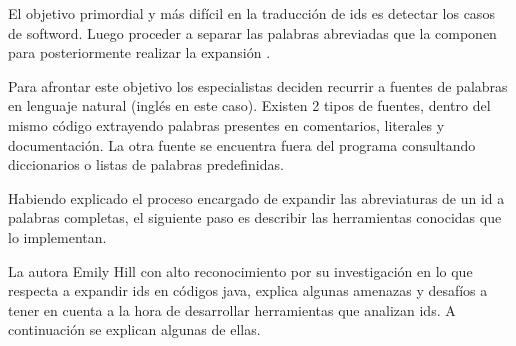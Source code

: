 \documentclass[a4paper,12pt]{report}
\begin{document}
\begin{framed}
\noindent El objetivo primordial y más difícil en la traducción de ids es detectar los casos de softword. Luego proceder a separar las palabras abreviadas que la componen para posteriormente realizar la expansión \cite{FBL06,LFBEX07}.  
\end{framed}

Para afrontar este objetivo los especialistas deciden recurrir a fuentes de palabras en lenguaje natural (inglés en este caso). Existen 2 tipos de fuentes, dentro del mismo código extrayendo palabras presentes en comentarios, literales y documentación. La otra fuente se encuentra fuera del programa consultando diccionarios o listas de palabras predefinidas. 

Habiendo explicado el proceso encargado de expandir las abreviaturas de un id a palabras completas, el siguiente paso es describir las herramientas conocidas que lo implementan. 

La autora Emily Hill \cite{EZH08} con alto reconocimiento por su investigación en lo que respecta a expandir ids en códigos java, explica algunas amenazas y desafíos a tener en cuenta a la hora de desarrollar herramientas que analizan ids. A continuación se explican algunas de ellas.
\end{document}
